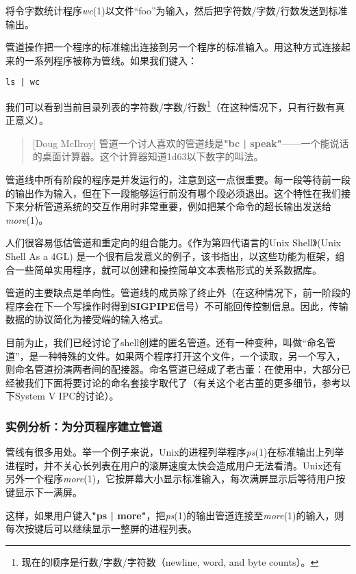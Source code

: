 \documentclass[12pt,oneside]{book}
\begin{document}
\begin{common-format}
将令字数统计程序\textit{wc}(1)以文件“foo”为输入，然后把字符数/字数/行数发送到标准输出。

管道操作把一个程序的标准输出连接到另一个程序的标准输入。用这种方式连接起来的一系列程序被称为管线。如果我们键入：
\begin{Verbatim}
ls | wc
\end{Verbatim}


我们可以看到当前目录列表的字符数/字数/行数\footnote{现在的顺序是行数/字数/字符数（newline, word, and byte counts）。}（在这种情况下，只有行数有真正意义）。

\begin{quote}[Doug McIlroy]
管道一个讨人喜欢的管道线是\textbf{"bc | speak"}——一个能说话的桌面计算器。这个计算器知道\num{1d63}以下数字的叫法。
\end{quote}

管道线中所有阶段的程序是并发运行的，注意到这一点很重要。每一段等待前一段的输出作为输入，但在下一段能够运行前没有哪个段必须退出。这个特性在我们接下来分析管道系统的交互作用时非常重要，例如把某个命令的超长输出发送给\textit{more}(1)。

人们很容易低估管道和重定向的组合能力。《作为第四代语言的Unix Shell》(Unix Shell As a 4GL) \cite{Schaffer-Wolf}是一个很有启发意义的例子，该书指出，以这些功能为框架，组合一些简单实用程序，就可以创建和操控简单文本表格形式的关系数据库。

管道的主要缺点是单向性。管道线的成员除了终止外（在这种情况下，前一阶段的程序会在下一个写操作时得到\textbf{SIGPIPE}信号）不可能回传控制信息。因此，传输数据的协议简化为接受端的输入格式。

目前为止，我们已经讨论了shell创建的匿名管道。还有一种变种，叫做“命名管道”，是一种特殊的文件。如果两个程序打开这个文件，一个读取，另一个写入，则命名管道扮演两者间的配接器。命名管道已经成了老古董：在使用中，大部分已经被我们下面将要讨论的命名套接字取代了（有关这个老古董的更多细节，参考以下System V IPC的讨论）。


\subsubsection{实例分析：为分页程序建立管道}
管线有很多用处。举一个例子来说，Unix的进程列举程序\textit{ps}(1)在标准输出上列举进程时，并不关心长列表在用户的滚屏速度太快会造成用户无法看清。Unix还有另外一个程序\textit{more}(1)，它按屏幕大小显示标准输入，每次满屏显示后等待用户按键显示下一满屏。

这样，如果用户键入\textbf{"ps | more"}，把\textit{ps}(1)的输出管道连接至\textit{more}(1)的输入，则每次按键后可以继续显示一整屏的进程列表。


\end{common-format}
\end{document}
